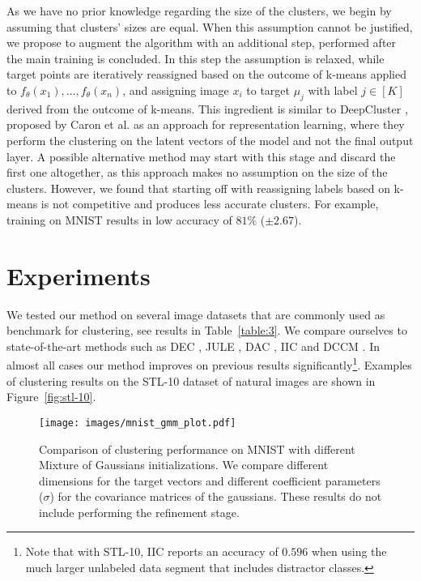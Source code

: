 \documentclass[a4paper,conference]{IEEEtran}
\begin{document}
As we have no prior knowledge regarding the size of the clusters, we begin by assuming that clusters' sizes are equal. When this assumption cannot be justified, we propose to augment the algorithm with an additional step, performed after the main training is concluded. In this step the assumption is relaxed, while target points are iteratively reassigned based on the outcome of k-means applied to $f_\theta(x_1),...,f_\theta(x_n)$, and assigning image $x_i$ to target $\mu_j$ with label $j\in[K]$ derived from the outcome of k-means. This ingredient is similar to DeepCluster \cite{caron2018deep}, proposed by Caron et al. as an approach for representation learning, where they perform the clustering on the latent vectors of the model and not the final output layer. A possible alternative method may start with this stage and discard the first one altogether, as this approach makes no assumption on the size of the clusters. However, we found that starting off with reassigning labels based on k-means is not competitive and produces less accurate clusters. For example, training on MNIST results in low accuracy of $81\%$ ($\pm 2.67$).

\section{Experiments}
\label{sec:exp}

We tested our method on several image datasets that are commonly used as benchmark for clustering, see results in Table~\ref{table:3}. We compare ourselves to state-of-the-art methods such as DEC \cite{Xie2015UnsupervisedDE}, JULE \cite{yangCVPR2016joint}, DAC \cite{Chang2017DeepAI}, IIC \cite{iic} and DCCM \cite{wu2019deep}. In almost all cases our method improves on previous results significantly\footnote{Note that with STL-10, IIC reports an accuracy of $0.596$ when using the much larger unlabeled data segment that includes distractor classes.}. Examples of clustering results on the STL-10 dataset of natural images are shown in Figure~\ref{fig:stl-10}.

\begin{figure*}[t]
\begin{center}
\texttt{[image: images/mnist\_gmm\_plot.pdf]}
\end{center}
\caption{Comparison of clustering performance on MNIST with different Mixture of Gaussians initializations. We compare different dimensions for the target vectors and different coefficient parameters ($\sigma$) for the covariance matrices of the gaussians. These results do not include performing the refinement stage.}
\label{fig:mnist_gmm}
\end{figure*}
\end{document}
